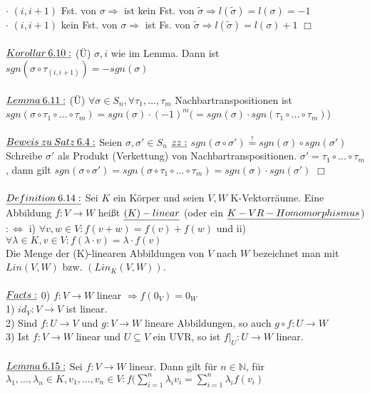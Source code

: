 \documentclass[fleqn, a4paper, 11pt]{scrartcl}
\newcommand{\NN}{\mathbb{N}}
\theoremstyle{definition}
\begin{document}
$\cdot$ $(i,i+1)$ Fst. von $\sigma\Rightarrow$ ist kein Fst. von $\tilde{\sigma}\Rightarrow l(\tilde{\sigma})=l(\sigma)=-1$\\
$\cdot$ $(i,i+1)$ kein Fst. von $\sigma\Rightarrow$ ist Fs. von $\tilde{\sigma}\Rightarrow l(\tilde{\sigma})=l(\sigma)+1$ \hfill $\Box$\\
\\
$\uline{Korollar\:6.10:}$ (\"U) $\sigma, i$ wie im Lemma. Dann ist $sgn(\sigma\circ\tau_{(i,i+1)})=-sgn(\sigma)$\\
\\
$\uline{Lemma\:6.11:}$ (\"U) $\forall\sigma\in S_n,\forall\tau_1,...,\tau_m$ Nachbartranspositionen ist $sgn(\sigma\circ\tau_1\circ...\circ\tau_m)=sgn(\sigma)\cdot(-1)^m (=sgn(\sigma)\cdot sgn(\tau_1\circ...\circ\tau_m)$)\\
\\
$\uline{Beweis\:zu\:Satz\:6.4:}$ Seien $\sigma,\sigma'\in S_n$ $\uline{zz:}$ $sgn(\sigma\circ\sigma')\stackrel{!}{=}sgn(\sigma)\circ sgn(\sigma')$\\
Schreibe $\sigma'$ als Produkt (Verkettung) von Nachbartranspositionen. $\sigma'=\tau_1\circ...\circ\tau_m$, dann gilt $sgn(\sigma\circ\sigma')=sgn(\sigma\circ\tau_1\circ...\circ\tau_m)=sgn(\sigma)\cdot sgn(\sigma')$ \hfill $\Box$\\
\\
$\uline{Definition\:6.14:}$ Sei $K$ ein Körper und seien $V,W$ K-Vektorräume. Eine Abbildung $f:V\rightarrow W$ heißt $\uline{(K)-linear}$ (oder ein $\uline{K-VR-Homomorphismus}$) $:\Leftrightarrow$ i) $\forall v,w\in V:f(v+w)=f(v)+f(w)$ und ii) $\forall\lambda\in K,v\in V:f(\lambda\cdot v)=\lambda\cdot f(v)$\\
Die Menge der (K)-linearen Abbildungen von $V$ nach $W$ bezeichnet man mit $Lin(V,W)$ bzw. $(Lin_K (V,W))$.\\
\\
$\uline{Facts:}$ 0) $f:V\rightarrow W$ linear $\Rightarrow f(0_V)=0_W$\\
1) $id_V:V\rightarrow V$ ist linear.\\
2) Sind $f:U\rightarrow V$ und $g:V\rightarrow W$ lineare Abbildungen, so auch $g\circ f:U\rightarrow W$\\
3) Ist $f:V\rightarrow W$ linear und $U\subseteq V$ ein UVR, so ist $f|_U:U\rightarrow W$ linear.\\
\\
$\uline{Lemma\:6.15:}$ Sei $f:V\rightarrow W$ linear. Dann gilt für $n\in\NN$, für $\lambda_1,...,\lambda_n\in K,v_1,...,v_n\in V:f(\sum\limits_{i=1}^n \lambda_i v_i=\sum\limits_{i=1}^n \lambda_i f(v_i)$\\
\end{document}
